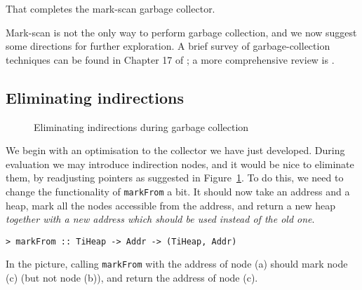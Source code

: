 That completes the mark-scan garbage collector.

Mark-scan is not the only way to perform garbage collection, and
we now suggest some directions for further exploration.
A brief survey of garbage-collection techniques can be found in
Chapter 17 of \cite{PJBook}; a more comprehensive review is \cite{Cohen}.

\subsection{Eliminating indirections}

\begin{figure} %

\caption{Eliminating indirections during garbage collection}
\label{fig:gc-ind}
\end{figure}
We begin with an optimisation to the collector we have just developed.
During evaluation we may introduce indirection nodes, and it would be nice
to eliminate them, by readjusting pointers as suggested in
Figure~\ref{fig:gc-ind}.
To do this, we need to change the functionality of \mbox{\tt markFrom} a bit.
It should now take an address and a heap, mark all the nodes accessible
from the address, and return a new heap {\em together with a new address
which should be used instead of the old one}.
\begin{verbatim}
> markFrom :: TiHeap -> Addr -> (TiHeap, Addr)
\end{verbatim}
%
In the picture, calling
\mbox{\tt markFrom} with the address of node (a) should mark node (c) (but not node
(b)), and return the address of node (c).

